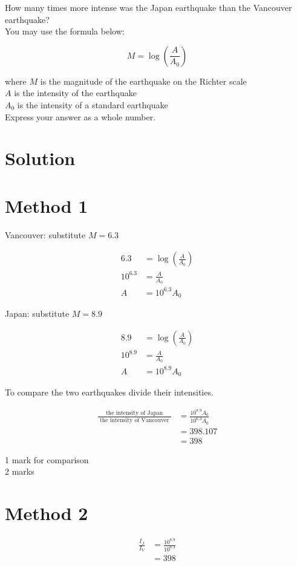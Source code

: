 \documentclass[10pt]{article}
\begin{document}
How many times more intense was the Japan earthquake than the Vancouver earthquake?\\
You may use the formula below:

$$
M=\log \left(\frac{A}{A_{0}}\right)
$$

where $M$ is the magnitude of the earthquake on the Richter scale\\
$A$ is the intensity of the earthquake\\
$A_{0}$ is the intensity of a standard earthquake\\
Express your answer as a whole number.

\section*{Solution}
\section*{Method 1}
Vancouver: substitute $M=6.3$

$$
\begin{aligned}
6.3 & =\log \left(\frac{A}{A_{0}}\right) \\
10^{6.3} & =\frac{A}{A_{0}} \\
A & =10^{6.3} A_{0}
\end{aligned}
$$

Japan: substitute $M=8.9$

$$
\begin{aligned}
8.9 & =\log \left(\frac{A}{A_{0}}\right) \\
10^{8.9} & =\frac{A}{A_{0}} \\
A & =10^{8.9} A_{0}
\end{aligned}
$$

To compare the two earthquakes divide their intensities.

$$
\begin{aligned}
\frac{\text { the intensity of Japan }}{\text { the intensity of Vancouver }} & =\frac{10^{8.9} A_{0}}{10^{6.3} A_{0}} \\
& =398.107 \\
& =398
\end{aligned}
$$

1 mark for comparison\\
2 marks

\section*{Method 2}
$$
\begin{aligned}
\frac{I_{J}}{I_{V}} & =\frac{10^{8.9}}{10^{6.3}} \\
& =398
\end{aligned}
$$
\end{document}

